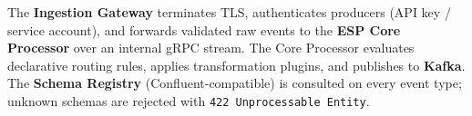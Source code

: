The \textbf{Ingestion Gateway} terminates TLS, authenticates producers (API key /
service account), and forwards validated raw events to the \textbf{ESP Core
Processor} over an internal gRPC stream. The Core Processor evaluates declarative
routing rules, applies transformation plugins, and publishes to \textbf{Kafka}. The
\textbf{Schema Registry} (Confluent-compatible) is consulted on every event type;
unknown schemas are rejected with \texttt{422 Unprocessable Entity}.

